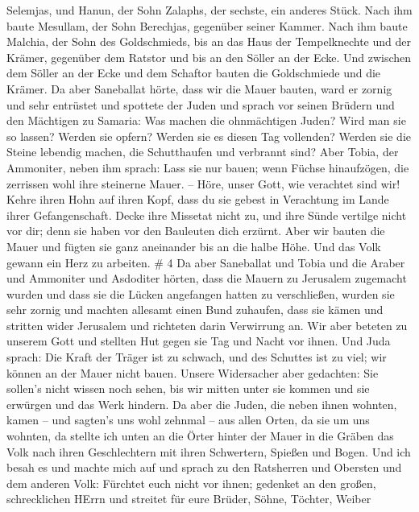 Selemjas, und Hanun, der Sohn Zalaphs, der sechste, ein anderes Stück.
Nach ihm baute Mesullam, der Sohn Berechjas, gegenüber seiner Kammer.
 Nach ihm baute Malchia, der Sohn des Goldschmieds, bis an
das Haus der Tempelknechte und der Krämer, gegenüber dem Ratstor und bis
an den Söller an der Ecke.  Und zwischen dem Söller an der
Ecke und dem Schaftor bauten die Goldschmiede und die Krämer.
 Da aber Saneballat hörte, dass wir die Mauer bauten, ward
er zornig und sehr entrüstet und spottete der Juden  und
sprach vor seinen Brüdern und den Mächtigen zu Samaria: Was machen die
ohnmächtigen Juden? Wird man sie so lassen? Werden sie opfern? Werden
sie es diesen Tag vollenden? Werden sie die Steine lebendig machen, die
Schutthaufen und verbrannt sind?  Aber Tobia, der
Ammoniter, neben ihm sprach: Lass sie nur bauen; wenn Füchse
hinaufzögen, die zerrissen wohl ihre steinerne Mauer. -- 
Höre, unser Gott, wie verachtet sind wir! Kehre ihren Hohn auf ihren
Kopf, dass du sie gebest in Verachtung im Lande ihrer Gefangenschaft.
 Decke ihre Missetat nicht zu, und ihre Sünde vertilge
nicht vor dir; denn sie haben vor den Bauleuten dich erzürnt.
 Aber wir bauten die Mauer und fügten sie ganz aneinander
bis an die halbe Höhe. Und das Volk gewann ein Herz zu arbeiten. \# 4
 Da aber Saneballat und Tobia und die Araber und Ammoniter
und Asdoditer hörten, dass die Mauern zu Jerusalem zugemacht wurden und
dass sie die Lücken angefangen hatten zu verschließen, wurden sie sehr
zornig  und machten allesamt einen Bund zuhaufen, dass sie
kämen und stritten wider Jerusalem und richteten darin Verwirrung an.
 Wir aber beteten zu unserem Gott und stellten Hut gegen sie
Tag und Nacht vor ihnen.  Und Juda sprach: Die Kraft der
Träger ist zu schwach, und des Schuttes ist zu viel; wir können an der
Mauer nicht bauen.  Unsere Widersacher aber gedachten: Sie
sollen's nicht wissen noch sehen, bis wir mitten unter sie kommen und
sie erwürgen und das Werk hindern.  Da aber die Juden, die
neben ihnen wohnten, kamen -- und sagten's uns wohl zehnmal -- aus allen
Orten, da sie um uns wohnten,  da stellte ich unten an die
Örter hinter der Mauer in die Gräben das Volk nach ihren Geschlechtern
mit ihren Schwertern, Spießen und Bogen.  Und ich besah es
und machte mich auf und sprach zu den Ratsherren und Obersten und dem
anderen Volk: Fürchtet euch nicht vor ihnen; gedenket an den großen,
schrecklichen HErrn und streitet für eure Brüder, Söhne, Töchter, Weiber
